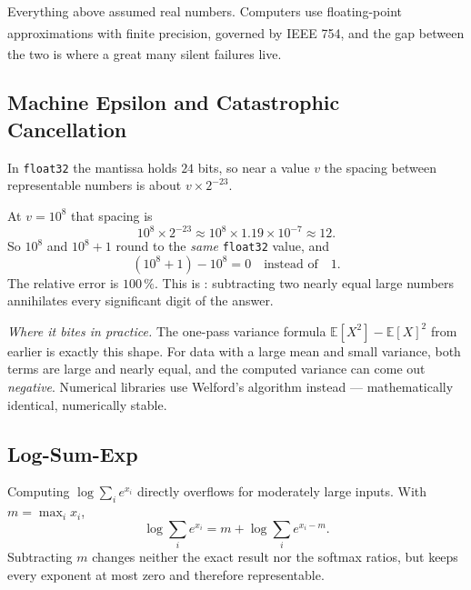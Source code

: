 Everything above assumed real numbers. Computers use floating-point
approximations with finite precision, governed by IEEE
754\textsuperscript{\cite{ieee754-2019}}, and the gap between the two is where
a great many silent failures live\textsuperscript{\cite{goldbergWhatEveryComputer1991}}.

\subsection{Machine Epsilon and Catastrophic Cancellation}

\begin{workedexample}
In \texttt{float32} the mantissa holds $24$ bits, so near a value $v$ the
spacing between representable numbers is about $v\times2^{-23}$.

At $v = 10^8$ that spacing is
\[
  10^8 \times 2^{-23} \approx 10^8 \times 1.19\times10^{-7} \approx 12 .
\]
So $10^8$ and $10^8+1$ round to the \emph{same} \texttt{float32} value, and
\[
  (10^8 + 1) - 10^8 = 0 \quad\text{instead of}\quad 1 .
\]
The relative error is $100\,\%$. This is :
subtracting two nearly equal large numbers annihilates every significant digit
of the answer.

\emph{Where it bites in practice.} The one-pass variance formula
$\mathbb{E}[X^2]-\mathbb{E}[X]^2$ from earlier is exactly this shape. For data
with a large mean and small variance, both terms are large and nearly equal, and
the computed variance can come out \emph{negative}. Numerical libraries use
Welford's algorithm instead --- mathematically identical, numerically stable.
\end{workedexample}

\subsection{Log-Sum-Exp}

Computing $\log\sum_i e^{x_i}$ directly overflows for moderately large inputs.
With $m = \max_i x_i$,
\begin{equation}
  \log\sum_i e^{x_i} = m + \log\sum_i e^{x_i - m}.
  \label{eq:math-logsumexp}
\end{equation}
Subtracting $m$ changes neither the exact result nor the softmax ratios, but
keeps every exponent at most zero and therefore representable.


